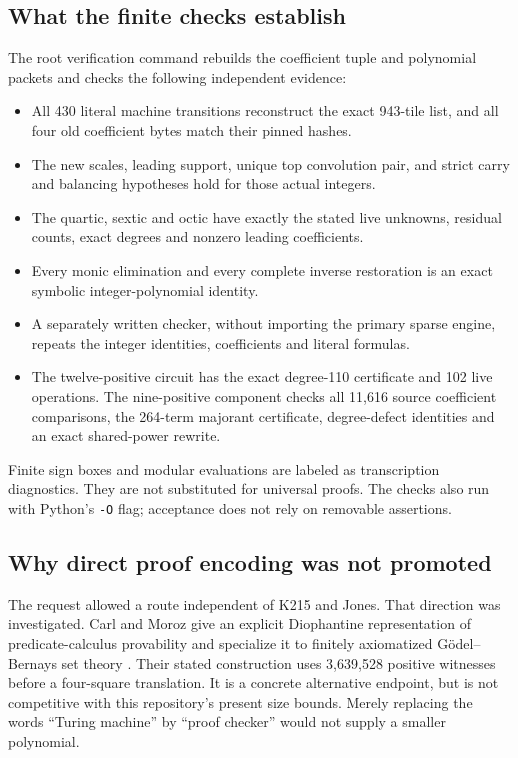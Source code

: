 \documentclass[11pt]{article}
\theoremstyle{definition}\newtheorem{definition}[theorem]{Definition}
\theoremstyle{remark}\newtheorem{remark}[theorem]{Remark}
\begin{document}
\subsection{What the finite checks establish}

The root verification command rebuilds the coefficient tuple and polynomial
packets and checks the following independent evidence:
\begin{itemize}
\item All 430 literal machine transitions reconstruct the exact 943-tile
  list, and all four old coefficient bytes match their pinned hashes.
\item The new scales, leading support, unique top convolution pair, and
  strict carry and balancing hypotheses hold for those actual integers.
\item The quartic, sextic and octic have exactly the stated live unknowns,
  residual counts, exact degrees and nonzero leading coefficients.
\item Every monic elimination and every complete inverse restoration is
  an exact symbolic integer-polynomial identity.
\item A separately written checker, without importing the primary sparse
  engine, repeats the integer identities, coefficients and literal formulas.
\item The twelve-positive circuit has the exact degree-110 certificate and
  102 live operations. The nine-positive component checks all 11,616 source
  coefficient comparisons, the 264-term majorant certificate, degree-defect
  identities and an exact shared-power rewrite.
\end{itemize}
Finite sign boxes and modular evaluations are labeled as transcription
diagnostics. They are not substituted for universal proofs. The checks
also run with Python's \texttt{-O} flag; acceptance does not rely on
removable assertions.

\subsection{Why direct proof encoding was not promoted}

The request allowed a route independent of K215 and Jones. That direction
was investigated. Carl and Moroz give an explicit Diophantine representation
of predicate-calculus provability and specialize it to finitely axiomatized
G\"odel--Bernays set theory \cite{carlmoroz}. Their stated construction
uses 3,639,528 positive witnesses before a four-square translation. It is
a concrete alternative endpoint, but is not competitive with this
repository's present size bounds. Merely replacing the words ``Turing
machine'' by ``proof checker'' would not supply a smaller polynomial.
\end{document}
